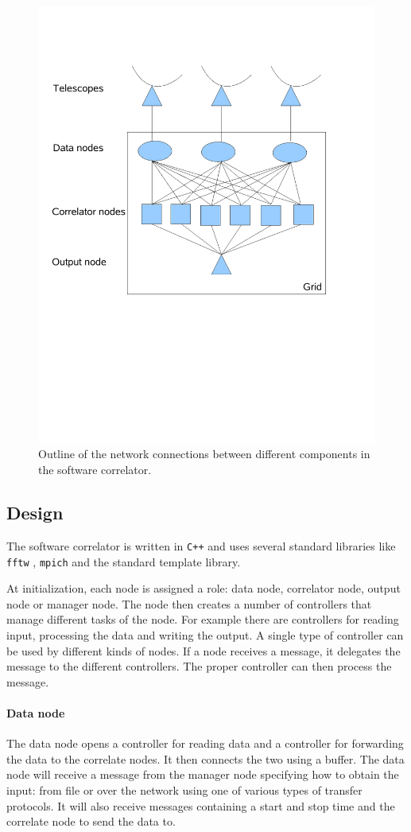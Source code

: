\begin{figure}
  \centering
  \includegraphics[width=.45\textwidth]
    {img/NetworkConnections}
    \caption{Outline of the network connections between different
      components in the software correlator.}
  \label{fig:netw_corr}
\end{figure}


\subsection{Design}
The software correlator is written in \verb~C++~ and uses several
standard libraries like \verb~fftw~ \cite{FFTW05}, \verb~mpich~
\cite{Gropp:1996:HPI} and the standard template library.

At initialization, each node is assigned a role: data node, correlator
node, output node or manager node. The node then creates a number of
controllers that manage different tasks of the node. For example there
are controllers for reading input, processing the data and writing the
output. A single type of controller can be used by different kinds of
nodes. If a node receives a message, it delegates the message to the
different controllers. The proper controller can then process the
message.

\paragraph{Data node}
The data node opens a controller for reading data and a controller for
forwarding the data to the correlate nodes. It then connects the two
using a buffer. The data node will receive a message from the manager
node specifying how to obtain the input: from file or over the network
using one of various types of transfer protocols. It will also receive
messages containing a start and stop time and the correlate node to
send the data to.

